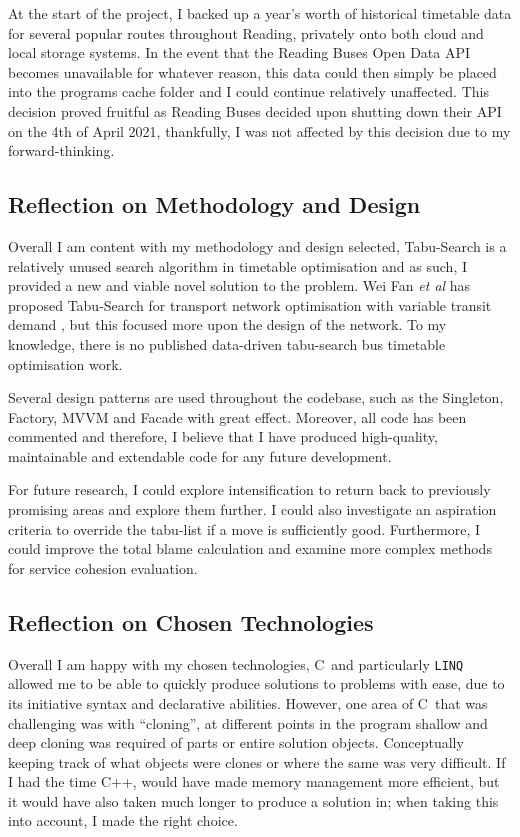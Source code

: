 \documentclass{article}
\newcommand{\CS}{C\nolinebreak\hspace{-.05em}\raisebox{.6ex}{\tiny\bf \#}}
\begin{document}
At the start of the project, I backed up a year's worth of historical timetable data for several popular routes throughout Reading, privately onto both cloud and local storage systems. In the event that the Reading Buses Open Data API becomes unavailable for whatever reason, this data could then simply be placed into the programs cache folder and I could continue relatively unaffected. This decision proved fruitful as Reading Buses decided upon shutting down their API on the 4th of April 2021, thankfully, I was not affected by this decision due to my forward-thinking.


\subsection{Reflection on Methodology and Design}
Overall I am content with my methodology and design selected, Tabu-Search is a relatively unused search algorithm in timetable optimisation and as such, I provided a new and viable novel solution to the problem.  Wei Fan \textsl{et al} has proposed Tabu-Search for transport network optimisation with variable transit demand \cite{RN25}, but this focused more upon the design of the network. To my knowledge, there is no published data-driven tabu-search bus timetable optimisation work.

\par
Several design patterns are used throughout the codebase, such as the Singleton, Factory, MVVM and Facade with great effect. Moreover, all code has been commented and therefore, I believe that I have produced high-quality, maintainable and extendable code for any future development. 


\par 
For future research, I could explore intensification to return back to previously promising areas and explore them further. I could also investigate an aspiration criteria to override the tabu-list if a move is sufficiently good. Furthermore, I could improve the total blame calculation and examine more complex methods for service cohesion evaluation. 


\subsection{Reflection on Chosen Technologies}

Overall I am happy with my chosen technologies, \CS \ and particularly \texttt{LINQ} allowed me to be able to quickly produce solutions to problems with ease, due to its initiative syntax and declarative abilities. However, one area of \CS \ that was challenging was with ``cloning'', at different points in the program shallow and deep cloning was required of parts or entire solution objects. Conceptually keeping track of what objects were clones or where the same was very difficult. If I had the time C++, would have made memory management more efficient, but it would have also taken much longer to produce a solution in; when taking this into account, I made the right choice. 
\end{document}
